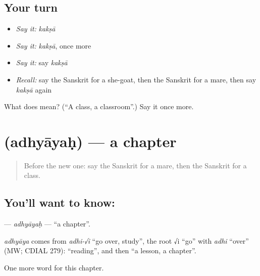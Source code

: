\subsection*{Your turn}
\begin{itemize}
\raggedright
  \item \emph{Say it:} \emph{kakṣā}
  \item \emph{Say it:} \emph{kakṣā}, once more
  \item \emph{Say it:} say \emph{kakṣā}
  \item \emph{Recall:} say the Sanskrit for a she-goat, then the Sanskrit for a mare, then say \emph{kakṣā} again
\end{itemize}

\begin{tcolorbox}[breakable,colback=teal!4,colframe=teal!35!black,title={Before you move on}]
What does  mean? (\textquotedblleft{}A class, a classroom\textquotedblright{}.) Say it once more.
\end{tcolorbox}
\section[\texorpdfstring{\sk{अध्यायः} (adhyāyaḥ)}{अध्यायः (adhyāyaḥ)}]{ (adhyāyaḥ) — a chapter}

\label{lesson:SA-C168-adhyayah}



\begin{quote}
Before the new one: say the Sanskrit for a mare, then the Sanskrit for a class.
\end{quote}

\subsection*{You'll want to know: }
\textbf{} — \emph{adhyāyaḥ} — \textquotedblleft{}a chapter\textquotedblright{}.

\begin{cousinweb}
\emph{adhyāya} comes from \emph{adhi-√i} \textquotedblleft{}go over, study\textquotedblright{}, the root √i \textquotedblleft{}go\textquotedblright{} with \emph{adhi} \textquotedblleft{}over\textquotedblright{} (MW; CDIAL 279): \textquotedblleft{}reading\textquotedblright{}, and then \textquotedblleft{}a lesson, a chapter\textquotedblright{}.
\end{cousinweb}

\begin{grammarlens}[title={What you've built}]
One more word for this chapter.
\end{grammarlens}

